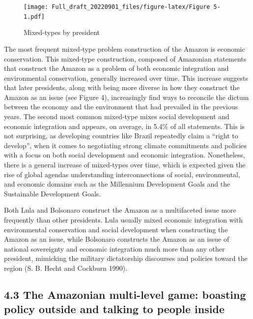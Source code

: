 \documentclass[
  12pt,
]{article}
\begin{document}
\begin{figure}
\centering
\texttt{[image: Full\_draft\_20220901\_files/figure-latex/Figure 5-1.pdf]}
\caption{Mixed-types by president}
\end{figure}

The most frequent mixed-type problem construction of the Amazon is
economic conservation. This mixed-type construction, composed of
Amazonian statements that construct the Amazon as a problem of both
economic integration and environmental conservation, generally increased
over time. This increase suggests that later presidents, along with
being more diverse in how they construct the Amazon as an issue (see
Figure 4), increasingly find ways to reconcile the dictum between the
economy and the environment that had prevailed in the previous years.
The second most common mixed-type mixes social development and economic
integration and appears, on average, in 5.4\% of all statements. This is
not surprising, as developing countries like Brazil repeatedly claim a
``right to develop'', when it comes to negotiating strong climate
commitments and policies with a focus on both social development and
economic integration. Nonetheless, there is a general increase of
mixed-types over time, which is expected given the rise of global
agendas understanding interconnections of social, environmental, and
economic domains such as the Millennium Development Goals and the
Sustainable Development Goals.

Both Lula and Bolsonaro construct the Amazon as a multifaceted issue
more frequently than other presidents. Lula usually mixed economic
integration with environmental conservation and social development when
constructing the Amazon as an issue, while Bolsonaro constructs the
Amazon as an issue of national sovereignty and economic integration much
more than any other president, mimicking the military dictatorship
discourses and policies toward the region (S. B. Hecht and Cockburn
1990).

\hypertarget{the-amazonian-multi-level-game-boasting-policy-outside-and-talking-to-people-inside}{%
\subsection{4.3 The Amazonian multi-level game: boasting policy outside
and talking to people
inside}\label{the-amazonian-multi-level-game-boasting-policy-outside-and-talking-to-people-inside}}
\end{document}
